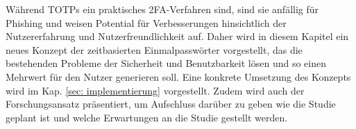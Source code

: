 Während TOTPs ein praktisches 2FA-Verfahren sind, sind sie anfällig für Phishing und 
weisen Potential für Verbesserungen hinsichtlich der Nutzererfahrung und 
Nutzerfreundlichkeit auf. Daher wird in diesem Kapitel ein neues Konzept der 
zeitbasierten Einmalpasswörter vorgestellt, das die bestehenden Probleme der 
Sicherheit und Benutzbarkeit lösen und so einen Mehrwert für den Nutzer generieren 
soll. Eine konkrete Umsetzung des Konzepts wird im Kap. \ref{sec: implementierung} 
vorgestellt. Zudem wird auch der Forschungsansatz präsentiert, um Aufschluss darüber 
zu geben wie die Studie geplant ist und welche Erwartungen an die Studie gestellt 
werden.